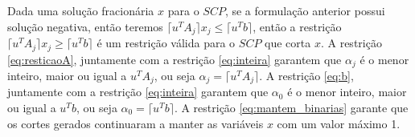 Dada uma solução fracionária $x$ para o $SCP$, se a formulação anterior possui solução negativa,
então teremos $ \lceil u^TA_j \rceil x_j \le \lceil u^Tb \rceil$, então a restrição
$ \lceil u^TA_j \rceil x_j \ge \lceil u^Tb \rceil$ é um restrição válida para o $SCP$ que corta $x$. A restrição \eqref{eq:resticaoA},
juntamente com a restrição \eqref{eq:inteira} garantem que $\alpha_j$ é o menor inteiro, maior ou igual a $u^TA_j$,
ou seja $\alpha_j = \lceil u^TA_j \rceil$.
A restrição \eqref{eq:b},
juntamente com a restrição \eqref{eq:inteira} garantem que $\alpha_0$ é o menor inteiro, maior ou igual a $u^Tb$, ou seja
$\alpha_0 = \lceil u^Tb \rceil$. A restrição \eqref{eq:mantem_binarias} garante que os cortes gerados continuaram
a manter as variáveis $x$ com um valor máximo 1.